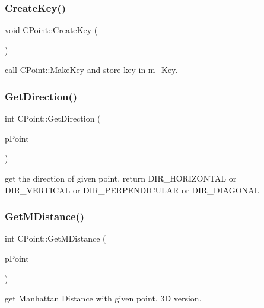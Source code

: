 \subsubsection{\texorpdfstring{CreateKey()}{CreateKey()}}
{\footnotesize\ttfamily void C\+Point\+::\+Create\+Key (\begin{DoxyParamCaption}{ }\end{DoxyParamCaption})}



call \mbox{\hyperlink{classCPoint_aa93327a1be5e5d9df55f3eb9750af25d}{C\+Point\+::\+Make\+Key}} and store key in m\+\_\+\+Key. 

\mbox{\label{classCPoint_add1e7b0b591f46026f281758a263da73}} 
\subsubsection{\texorpdfstring{GetDirection()}{GetDirection()}}
{\footnotesize\ttfamily int C\+Point\+::\+Get\+Direction (\begin{DoxyParamCaption}\item[{\mbox{\hyperlink{classCPoint}{C\+Point}} $\ast$}]{p\+Point }\end{DoxyParamCaption})}

get the direction of given point. return D\+I\+R\+\_\+\+H\+O\+R\+I\+Z\+O\+N\+T\+AL or D\+I\+R\+\_\+\+V\+E\+R\+T\+I\+C\+AL or D\+I\+R\+\_\+\+P\+E\+R\+P\+E\+N\+D\+I\+C\+U\+L\+AR or D\+I\+R\+\_\+\+D\+I\+A\+G\+O\+N\+AL \mbox{\label{classCPoint_a46b97b169fa384088ee36894fdf4c40d}} 
\subsubsection{\texorpdfstring{GetMDistance()}{GetMDistance()}}
{\footnotesize\ttfamily int C\+Point\+::\+Get\+M\+Distance (\begin{DoxyParamCaption}\item[{\mbox{\hyperlink{classCPoint}{C\+Point}} $\ast$}]{p\+Point }\end{DoxyParamCaption})}



get Manhattan Distance with given point. 3D version. 

\mbox{\label{classCPoint_ab6f68628b53f852dc41210196464c004}} 
